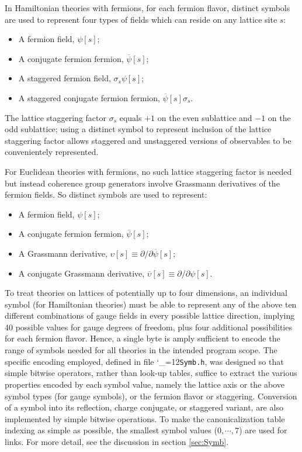 \documentclass [12pt]{article}
\makeatletter
\renewcommand{\tt}{\begingroup\catcode`_=12\def\_{\string_}\tt@}
\newcommand{\tt@}[1]{\texttt{#1}\endgroup}
\makeatother
\begin{document}
    In Hamiltonian theories with fermions,
    for each fermion flavor,
    distinct symbols are used to represent
    four types of fields which can reside on any lattice site $s$:
    \begin{itemize}\advance\itemsep -8pt
    \item A fermion field, $\psi[s]$;
    \item A conjugate fermion fermion, $\overline\psi[s]$;
    \item A staggered fermion field, $\sigma_s \psi[s]$;
    \item A staggered conjugate fermion fermion, $\overline\psi[s] \sigma_s$.
    \end{itemize}
    The lattice staggering factor $\sigma_s$ equals $+1$ on the even sublattice
    and $-1$ on the odd sublattice;
    using a distinct symbol to represent inclusion of the lattice staggering factor
    allows staggered and unstaggered versions of observables to be convenientely
    represented.

    For Euclidean theories with fermions, no such lattice staggering factor is needed but
    instead coherence group generators involve Grassmann derivatives of the
    fermion fields. 
    So distinct symbols are used to represent:
    \begin{itemize}\advance\itemsep -8pt
    \item A fermion field, $\psi[s]$;
    \item A conjugate fermion fermion, $\overline\psi[s]$;
    \item A Grassmann derivative, $\upsilon[s] \equiv \partial/ \partial\overline\psi[s]$;
    \item A conjugate Grassmann derivative, $\overline\upsilon[s] \equiv \partial/\partial \psi[s]$.
    \end{itemize}

    To treat theories on lattices of potentially up to four dimensions,
    an individual symbol (for Hamiltonian theories)
    must be able to represent any of the above ten different combinations
    of gauge fields in every possible lattice direction,
    implying 40 possible values for gauge degrees of freedom, plus
    four additional possibilities for each fermion flavor.
    Hence, a single byte is amply sufficient to encode the range of symbols needed
    for all theories in the intended program scope.
    The specific encoding employed, defined in file \tt{Symb.h},
    was designed so that simple bitwise operators,
    rather than look-up tables,
    suffice to extract the various properties encoded by each symbol value,
    namely the lattice axis or the above symbol types (for gauge symbols),
    or the fermion flavor or staggering.
    Conversion of a symbol into its reflection, charge conjugate,
    or staggered variant, are also implemented by simple bitwise operations.
    To make the canonicalization table indexing as simple as possible,
    the smallest symbol values ($0,{\cdots},7$) are used for links.
    For more detail, see the discussion in section \ref{sec:Symb}.
\end{document}
